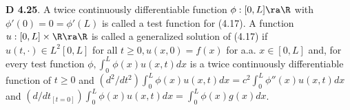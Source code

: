 {\bf D 4.25}. A twice continuously differentiable function $\phi: [0,L] \ra \R$ with $\phi'(0)=0=\phi'(L)$ is called a test function for (4.17). A function $u:[0,L] \times \R \ra \R$ is called a generalized solution of (4.17) if $u(t,\cdot) \in L^2[0,L]$ for all $t \geq 0, u(x,0)=f(x)$ for a.a. $x \in [0,L]$ and, for every test function $\phi, \int_0^L \phi(x)u(x,t)dx$ is a twice continuously differentiable function of $t \geq 0$ and $(d^2/dt^2) \int_0^L \phi(x) u(x,t)dx = c^2 \int_0^L \phi''(x) u(x,t)dx$ and $ (d/dt_{[t=0]})\int_0^L\phi(x)u(x,t)dx=\int_0^L\phi(x)g(x)dx$. 